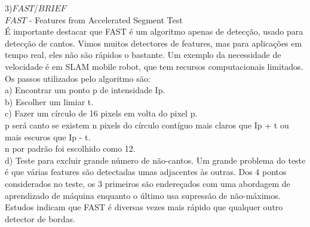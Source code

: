 \documentclass[conference]{IEEEtran}
\begin{document}
	 3)$FAST$/$BRIEF$					\\
	 $FAST$ - Features from Accelerated Segment Test	\\
	 \'E importante destacar que FAST \'e um algoritmo  apenas de detec\c{c}\~ao, usado para detec\c{c}\~ao de cantos.
	 Vimos muitos detectores de features, mas para aplica\c{c}\~oes em tempo real, eles n\~ao s\~ao r\'apidos o bastante.
	 Um exemplo da necessidade de velocidade \'e em SLAM mobile robot, que tem recursos computacionais limitados. Os passos
	 utilizados pelo algoritmo s\~ao:	\\
	    a) Encontrar um ponto p de intensidade Ip.	\\
	    b) Escolher um limiar t.	\\
	    c) Fazer um c\'irculo de 16 pixels em volta do pixel p. \\
	    p ser\'a canto se existem n pixels do c\'irculo cont\'iguo mais claros que Ip + t ou mais escuros que Ip - t.
	    \\ n por padr\~ao foi escolhido como 12.	\\
	    d) Teste para excluir grande n\'umero de n\~ao-cantos. Um grande problema do teste \'e que v\'arias features s\~ao 
	    detectadas umas adjacentes \`as outras. Dos 4 pontos considerados no teste, os 3 primeiros s\~ao endere\c{c}ados 
	    com uma abordagem de aprendizado de m\'aquina enquanto o \'ultimo usa supress\~ao de n\~ao-m\'aximos.	\\
	    
	    Estudos indicam que FAST \'e diversas vezes mais r\'apido que qualquer outro detector de bordas.	\\
	    
\end{document}

